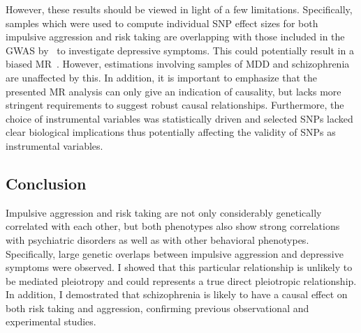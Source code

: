 However, these results should be viewed in light of a few limitations.
Specifically, samples which were used to compute individual SNP effect sizes for both impulsive aggression and risk taking are overlapping with those included in the GWAS by~\cite{Okbay2016} to investigate depressive symptoms.
This could potentially result in a biased MR~\cite{Burgess2016c}.
However, estimations involving samples of MDD and schizophrenia are unaffected by this.
In addition, it is important to emphasize that the  presented MR analysis can only give an indication of causality, but lacks more stringent requirements to suggest robust causal relationships.
Furthermore, the choice of instrumental variables was statistically driven and selected SNPs lacked  clear biological implications thus potentially affecting the validity of SNPs as instrumental variables.

\subsection{Conclusion}
\label{sub:conclusion_psych}

Impulsive aggression and risk taking are not only considerably genetically correlated with  each other, but both phenotypes also show strong correlations with psychiatric disorders as well as with other behavioral phenotypes.
Specifically, large genetic overlaps between impulsive aggression and depressive symptoms were observed.
I showed that this particular relationship is unlikely to be mediated pleiotropy and could represents a true direct pleiotropic relationship.
In addition, I demostrated that schizophrenia is likely to have a causal effect on both risk taking and aggression,
confirming previous observational and experimental studies.

